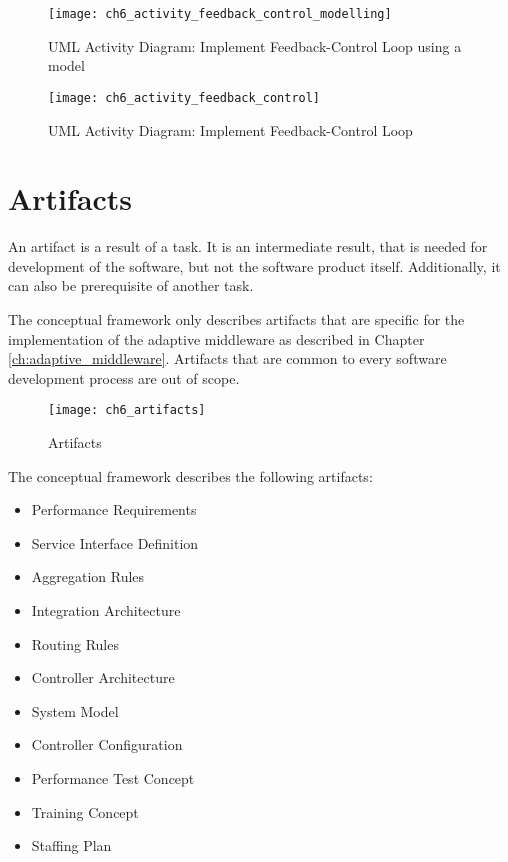 \begin{figure}[htpb] \centering 
	\texttt{[image: ch6\_activity\_feedback\_control\_modelling]} 
	\caption{\ac{UML} Activity Diagram: Implement Feedback-Control Loop using a model} 
	\label{fig:ch6_activiy_feedback_control_model} 
\end{figure}

\begin{figure}[htpb] \centering 
	\texttt{[image: ch6\_activity\_feedback\_control]} 
	\caption{\ac{UML} Activity Diagram: Implement Feedback-Control Loop} 
	\label{fig:ch6_activiy_feedback_control} 
\end{figure}

\section{Artifacts}\label{sec:ch6_artifacts}

An artifact is a result of a task. It is an intermediate result, that is needed for development of the software, but not the software product itself. Additionally, it can also be prerequisite of another task. 

The conceptual framework only describes artifacts that are specific for the implementation of the adaptive middleware as described in Chapter \ref{ch:adaptive_middleware}. Artifacts that are common to every software development process are out of scope.

\begin{figure}[htpb] \centering 
	\texttt{[image: ch6\_artifacts]} 
	\caption{Artifacts} 
	\label{fig:ch6_artifacts} 
\end{figure}

The conceptual framework describes the following artifacts:

\begin{itemize}
	\item Performance Requirements
	\item Service Interface Definition
	\item Aggregation Rules
	\item Integration Architecture
	\item Routing Rules
	\item Controller Architecture
	\item System Model
	\item Controller Configuration
	\item Performance Test Concept
	\item Training Concept
	\item Staffing Plan
\end{itemize}

